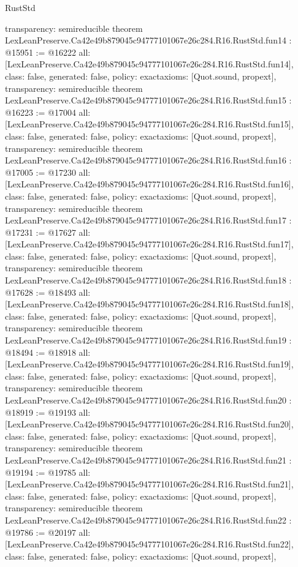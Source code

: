 \begin{lexlean}{RustStd}
\begin{coremodule}
{  transparency: semireducible
}
theorem LexLeanPreserve.Ca42e49b879045c94777101067e26c284.R16.RustStd.fun14 : @15951 := @16222 {
  all: [LexLeanPreserve.Ca42e49b879045c94777101067e26c284.R16.RustStd.fun14],
  class: false,
  generated: false,
  policy: exact{axioms: [Quot.sound, propext]},
  transparency: semireducible
}
theorem LexLeanPreserve.Ca42e49b879045c94777101067e26c284.R16.RustStd.fun15 : @16223 := @17004 {
  all: [LexLeanPreserve.Ca42e49b879045c94777101067e26c284.R16.RustStd.fun15],
  class: false,
  generated: false,
  policy: exact{axioms: [Quot.sound, propext]},
  transparency: semireducible
}
theorem LexLeanPreserve.Ca42e49b879045c94777101067e26c284.R16.RustStd.fun16 : @17005 := @17230 {
  all: [LexLeanPreserve.Ca42e49b879045c94777101067e26c284.R16.RustStd.fun16],
  class: false,
  generated: false,
  policy: exact{axioms: [Quot.sound, propext]},
  transparency: semireducible
}
theorem LexLeanPreserve.Ca42e49b879045c94777101067e26c284.R16.RustStd.fun17 : @17231 := @17627 {
  all: [LexLeanPreserve.Ca42e49b879045c94777101067e26c284.R16.RustStd.fun17],
  class: false,
  generated: false,
  policy: exact{axioms: [Quot.sound, propext]},
  transparency: semireducible
}
theorem LexLeanPreserve.Ca42e49b879045c94777101067e26c284.R16.RustStd.fun18 : @17628 := @18493 {
  all: [LexLeanPreserve.Ca42e49b879045c94777101067e26c284.R16.RustStd.fun18],
  class: false,
  generated: false,
  policy: exact{axioms: [Quot.sound, propext]},
  transparency: semireducible
}
theorem LexLeanPreserve.Ca42e49b879045c94777101067e26c284.R16.RustStd.fun19 : @18494 := @18918 {
  all: [LexLeanPreserve.Ca42e49b879045c94777101067e26c284.R16.RustStd.fun19],
  class: false,
  generated: false,
  policy: exact{axioms: [Quot.sound, propext]},
  transparency: semireducible
}
theorem LexLeanPreserve.Ca42e49b879045c94777101067e26c284.R16.RustStd.fun20 : @18919 := @19193 {
  all: [LexLeanPreserve.Ca42e49b879045c94777101067e26c284.R16.RustStd.fun20],
  class: false,
  generated: false,
  policy: exact{axioms: [Quot.sound, propext]},
  transparency: semireducible
}
theorem LexLeanPreserve.Ca42e49b879045c94777101067e26c284.R16.RustStd.fun21 : @19194 := @19785 {
  all: [LexLeanPreserve.Ca42e49b879045c94777101067e26c284.R16.RustStd.fun21],
  class: false,
  generated: false,
  policy: exact{axioms: [Quot.sound, propext]},
  transparency: semireducible
}
theorem LexLeanPreserve.Ca42e49b879045c94777101067e26c284.R16.RustStd.fun22 : @19786 := @20197 {
  all: [LexLeanPreserve.Ca42e49b879045c94777101067e26c284.R16.RustStd.fun22],
  class: false,
  generated: false,
  policy: exact{axioms: [Quot.sound, propext]},
}
\end{coremodule}
\end{lexlean}
